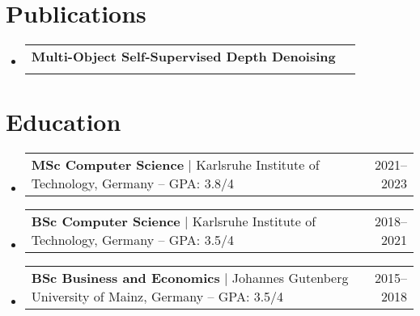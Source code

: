 \documentclass[letterpaper,11pt]{article}
\makeatletter
\newcommand{\resumeProjectHeading}[2]{
    \item
    \begin{tabular*}{0.97\textwidth}{l@{\extracolsep{\fill}}r}
      \small#1 & #2 \\
    \end{tabular*}\vspace{-7pt}
}
\newcommand{\resumeSubHeadingListStart}{\begin{itemize}[leftmargin=0.15in, label={}]}
\newcommand{\resumeSubHeadingListEnd}{\end{itemize}}
\makeatother
\begin{document}
\section{Publications}
\resumeSubHeadingListStart
\resumeProjectHeading{\textbf{Multi-Object Self-Supervised Depth Denoising} \space [Kienle \& Petri, 2023, \href{https://arxiv.org/abs/2305.05778}{{arXiv: 2305.05778}}]}\\
\resumeSubHeadingListEnd

\section{Education}
\resumeSubHeadingListStart
\resumeProjectHeading
{\textbf{MSc Computer Science} \space $|$ \space Karlsruhe Institute of Technology, Germany -- GPA: 3.8/4}{2021--2023}
\resumeProjectHeading
{\textbf{BSc Computer Science} \space $|$ \space Karlsruhe Institute of Technology, Germany -- GPA: 3.5/4}{2018--2021}
\resumeProjectHeading
{\textbf{BSc Business and Economics} \space $|$ \space Johannes Gutenberg University of Mainz, Germany -- GPA: 3.5/4}{2015--2018}
\resumeSubHeadingListEnd

\end{document}
